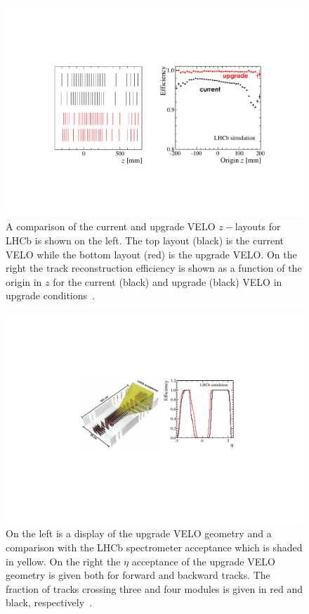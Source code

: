 \begin{figure}[t]
  \centerline{\includegraphics[width=\textwidth]{figures/lhcb_veloperf.pdf}}
  \caption{A comparison of the current and upgrade VELO $z-$layouts for LHCb is shown on the left. The top layout (black) is the current VELO while the bottom layout (red) is the upgrade VELO. On the right the track reconstruction efficiency is shown as a function of the origin in $z$ for the current (black) and upgrade (black) VELO in upgrade conditions~\cite{LHCb-TDR-013}.}
  \label{fig:veloeff}
\end{figure}

\begin{figure}[t]
\centerline{\includegraphics[width=\textwidth]{figures/lhcb_veloacceptance2.pdf}}
  \caption{On the left is a display of the upgrade VELO geometry and a comparison with the LHCb spectrometer acceptance which is shaded in yellow. On the right the $\eta$ acceptance of the upgrade VELO geometry is given both for forward and backward tracks. The fraction of tracks crossing three and four modules is given in red and black, respectively~\cite{LHCb-TDR-013}.}
  \label{fig:ulhcb_veloacc}
\end{figure}


